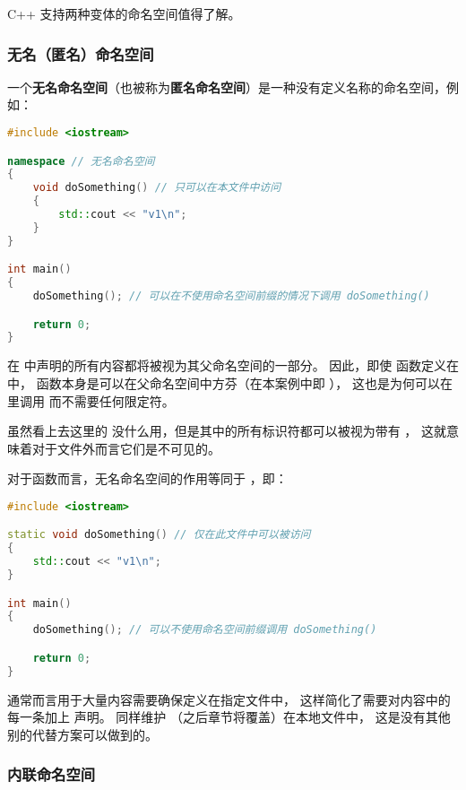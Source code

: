 \documentclass[../../LearnCpp.tex]{subfiles}
\begin{document}

C++ 支持两种变体的命名空间值得了解。

\subsubsection*{无名（匿名）命名空间}

一个\textbf{无名命名空间}（也被称为\textbf{匿名命名空间}）是一种没有定义名称的命名空间，例如：

\begin{lstlisting}[language=C++]
#include <iostream>

namespace // 无名命名空间
{
    void doSomething() // 只可以在本文件中访问
    {
        std::cout << "v1\n";
    }
}

int main()
{
    doSomething(); // 可以在不使用命名空间前缀的情况下调用 doSomething()

    return 0;
}
\end{lstlisting}

在  中声明的所有内容都将被视为其父命名空间的一部分。
因此，即使  函数定义在  中，
函数本身是可以在父命名空间中方芬（在本案例中即 ），
这也是为何可以在  里调用  而不需要任何限定符。

虽然看上去这里的  没什么用，但是其中的所有标识符都可以被视为带有 ，
这就意味着对于文件外而言它们是不可见的。

对于函数而言，无名命名空间的作用等同于 ，即：

\begin{lstlisting}[language=C++]
#include <iostream>

static void doSomething() // 仅在此文件中可以被访问
{
    std::cout << "v1\n";
}

int main()
{
    doSomething(); // 可以不使用命名空间前缀调用 doSomething()

    return 0;
}
\end{lstlisting}

 通常而言用于大量内容需要确保定义在指定文件中，
这样简化了需要对内容中的每一条加上  声明。
 同样维护 （之后章节将覆盖）在本地文件中，
这是没有其他别的代替方案可以做到的。

\subsubsection*{内联命名空间}
\end{document}
